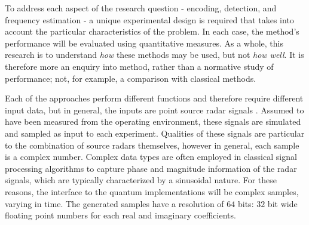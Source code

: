 To address each aspect of the research question - encoding, detection, and frequency estimation - a unique experimental design is required that takes into account the particular characteristics of the problem.
In each case, the method's performance will be evaluated using quantitative measures.
As a whole, this research is to understand \textit{how} these methods may be used, but not \textit{how well}.
It is therefore more an enquiry into method, rather than a normative study of performance; not, for example, a comparison with classical methods.

Each of the approaches perform different functions and therefore require different input data, but in general, the inputs are point source radar signals \cite{chakravorty_what_2018}.
Assumed to have been measured from the operating environment, these signals are simulated and sampled as input to each experiment.
Qualities of these signals are particular to the combination of source radars themselves, however in general, each sample is a complex number.
Complex data types are often employed in classical signal processing algorithms to capture phase and magnitude information of the radar signals, which are typically characterized by a sinusoidal nature.
For these reasons, the interface to the quantum implementations will be complex samples, varying in time.
The generated samples have a resolution of \(64\) bits: \(32\) bit wide floating point numbers for each real and imaginary coefficients.

